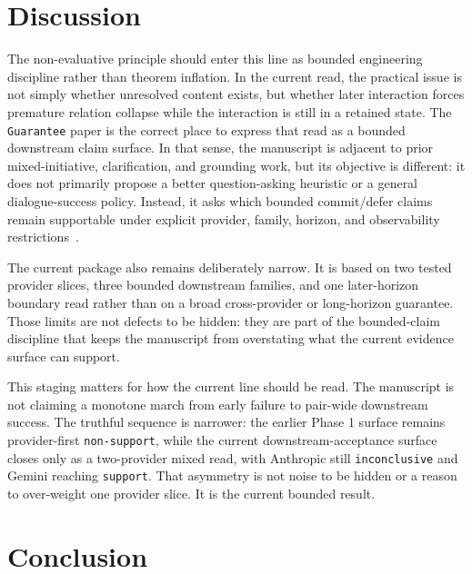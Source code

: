 \documentclass[11pt]{article}
\begin{document}
\section{Discussion}

The non-evaluative principle should enter this line as bounded engineering
discipline rather than theorem inflation. In the current read, the practical issue
is not simply whether unresolved content exists, but whether later interaction
forces premature relation collapse while the interaction is still in a retained
state. The \texttt{Guarantee} paper is the correct place to express that read as
a bounded downstream claim surface. In that sense, the manuscript is adjacent to
prior mixed-initiative, clarification, and grounding work, but its objective is
different: it does not primarily propose a better question-asking heuristic or a
general dialogue-success policy. Instead, it asks which bounded commit/defer
claims remain supportable under explicit provider, family, horizon, and
observability restrictions~\cite{chucarroll2000mimic,deboni2003clarification,rao2018evpi,benotti2021grounding}.

The current package also remains deliberately narrow. It is based on two tested
provider slices, three bounded downstream families, and one later-horizon
boundary read rather than on a broad cross-provider or long-horizon guarantee.
Those limits are not defects to be hidden: they are part of the bounded-claim
discipline that keeps the manuscript from overstating what the current evidence
surface can support.

This staging matters for how the current line should be read. The manuscript is
not claiming a monotone march from early failure to pair-wide downstream
success. The truthful sequence is narrower: the earlier Phase 1 surface remains
provider-first \texttt{non-support}, while the current downstream-acceptance
surface closes only as a two-provider mixed read, with Anthropic still
\texttt{inconclusive} and Gemini reaching \texttt{support}. That asymmetry is
not noise to be hidden or a reason to over-weight one provider slice. It is the
current bounded result.

\section{Conclusion}
\end{document}
